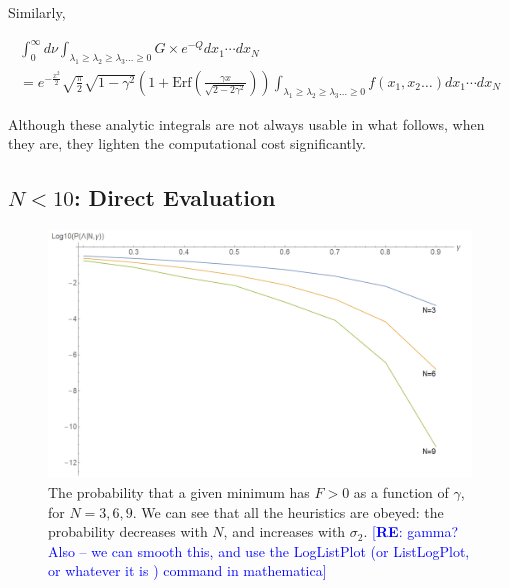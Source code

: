 \documentclass[12pt]{article}
\newcommand{\re}[1]{\textcolor{blue}{[{\bf RE}: #1]}}
\begin{document}
Similarly, 

\begin{equation}
\begin{split}
\int^\infty_0 d\nu \int_{\lambda_1 \geq \lambda_2 \geq \lambda_3 \ldots \geq 0} G \times e^{-Q} dx_1  \cdots dx_N \\ 
= e^{-\frac{x^2}{2}} \sqrt{\frac{\pi}{2}}\sqrt{1-\gamma^2} (1+\mathrm{Erf}(\frac{\gamma x}{\sqrt{2-2\gamma^2}})) \int_{\lambda_1 \geq \lambda_2 \geq \lambda_3 \ldots \geq 0} f(x_1, x_2 \ldots) dx_1  \cdots dx_N
\end{split}
\end{equation}

Although these analytic integrals are not always usable in what follows, when they are, they lighten the computational cost significantly.

\subsection{$N < 10$: Direct Evaluation  }

\begin{figure}
  \centering
  \includegraphics[width=\linewidth]{N369.png}
  \caption{The probability that a given minimum has $F > 0$ as a function of $\gamma$, for $N=3, 6, 9$. We can see that all the heuristics are obeyed: the probability decreases with $N$, and increases with $\sigma_2$. \re{gamma?  Also -- we can smooth this, and use the LogListPlot (or ListLogPlot, or whatever it is ) command in mathematica}}
  \label{N6}
\end{figure}
\end{document}
